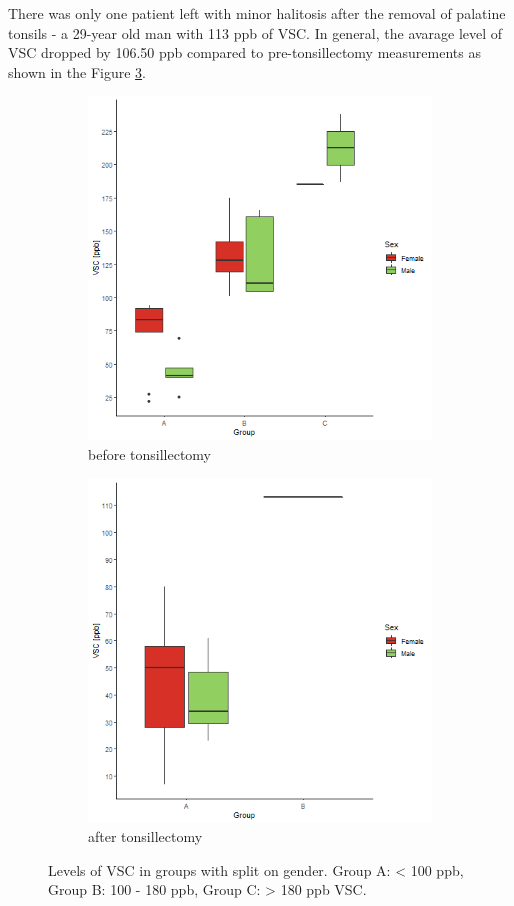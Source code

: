 \documentclass[12pt,a4paper,notitlepage]{report}
\begin{document}
There was only one patient left with minor halitosis after the removal of palatine tonsils - a 29-year old man with 113 ppb of VSC.
In general, the avarage level of VSC dropped by 106.50 ppb compared to pre-tonsillectomy measurements as shown in the Figure \ref{fig:Fig_3.1}.


\begin{figure}[H]
	\centering
	\begin{subfigure}[b]{0.85\textwidth}
		\centering
		\includegraphics[width=.9\textwidth, height=.75\textwidth]{./Figures/Fig_3.1a2} 
		\caption{before tonsillectomy}
		\label{fig:Fig_3.1a}
	\end{subfigure} 
	\vspace*{2cm}
	
	\begin{subfigure}[b]{0.85\textwidth}
		\centering
		\includegraphics[width=.9\textwidth, height=.75\textwidth]{./Figures/Fig_3.1b2}
		\caption{after tonsillectomy}
		\label{fig:Fig_3.1b}
	\end{subfigure}
	 
	\caption{Levels of VSC in groups with split on gender. Group A: < 100 ppb, Group B: 100 - 180 ppb, Group C: > 180 ppb VSC.}
	\label{fig:Fig_3.1}
\end{figure}
\end{document}

